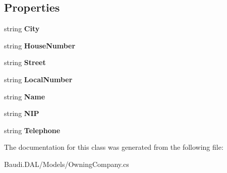 \subsection*{Properties}
\begin{DoxyCompactItemize}
\item 
\hypertarget{class_baudi_1_1_d_a_l_1_1_models_1_1_owning_company_aa70ae6c417171e38ac1e4016fd77a300}{}string {\bfseries City}\label{class_baudi_1_1_d_a_l_1_1_models_1_1_owning_company_aa70ae6c417171e38ac1e4016fd77a300}

\item 
\hypertarget{class_baudi_1_1_d_a_l_1_1_models_1_1_owning_company_ac0226e22f6328d2dfd0ed4305f7fec65}{}string {\bfseries House\+Number}\label{class_baudi_1_1_d_a_l_1_1_models_1_1_owning_company_ac0226e22f6328d2dfd0ed4305f7fec65}

\item 
\hypertarget{class_baudi_1_1_d_a_l_1_1_models_1_1_owning_company_a07bd9fde66f783855a0cd83e92c85448}{}string {\bfseries Street}\label{class_baudi_1_1_d_a_l_1_1_models_1_1_owning_company_a07bd9fde66f783855a0cd83e92c85448}

\item 
\hypertarget{class_baudi_1_1_d_a_l_1_1_models_1_1_owning_company_a268e4bd2cde83b54f315d5038a67ec27}{}string {\bfseries Local\+Number}\label{class_baudi_1_1_d_a_l_1_1_models_1_1_owning_company_a268e4bd2cde83b54f315d5038a67ec27}

\item 
\hypertarget{class_baudi_1_1_d_a_l_1_1_models_1_1_owning_company_a74db4b32cd296bd3d0e26882c419727e}{}string {\bfseries Name}\label{class_baudi_1_1_d_a_l_1_1_models_1_1_owning_company_a74db4b32cd296bd3d0e26882c419727e}

\item 
\hypertarget{class_baudi_1_1_d_a_l_1_1_models_1_1_owning_company_ada24e6edfe434592051142f043270795}{}string {\bfseries N\+I\+P}\label{class_baudi_1_1_d_a_l_1_1_models_1_1_owning_company_ada24e6edfe434592051142f043270795}

\item 
\hypertarget{class_baudi_1_1_d_a_l_1_1_models_1_1_owning_company_afbdd4977d02891cb593745f0debe0b0c}{}string {\bfseries Telephone}\label{class_baudi_1_1_d_a_l_1_1_models_1_1_owning_company_afbdd4977d02891cb593745f0debe0b0c}

\end{DoxyCompactItemize}


The documentation for this class was generated from the following file\+:\begin{DoxyCompactItemize}
\item 
Baudi.\+D\+A\+L/\+Models/Owning\+Company.\+cs\end{DoxyCompactItemize}
